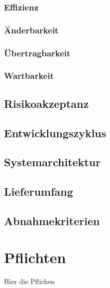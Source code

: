 \documentclass[a4paper,12pt]{article}
\begin{document}
            \subsubsection{Effizienz}
            
            
            \subsubsection{Änderbarkeit}
            
            
            \subsubsection{Übertragbarkeit}
            
            
            \subsubsection{Wartbarkeit}
            
        
        \subsection{Risikoakzeptanz}
 		
        
        \subsection{Entwicklungszyklus}
 		
        
        \subsection{Systemarchitektur} %
 		
        
        \subsection{Lieferumfang} %
 		
        
        \subsection{Abnahmekriterien} %
 		
 	\clearpage

	\section{Pflichten}
 	Hier die Pflichen
\end{document}
